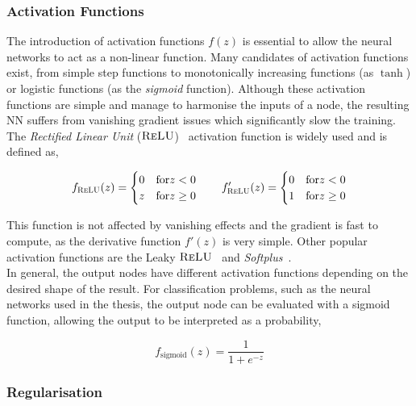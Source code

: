\subsubsection{Activation Functions}

The introduction of activation functions $f(z)$ is essential to allow the neural networks to act as a non-linear function. Many candidates of activation functions exist, from simple step functions to monotonically increasing functions (as $\tanh$) or logistic functions (as the \textit{sigmoid} function). Although these activation functions are simple and manage to harmonise the inputs of a node, the resulting NN suffers from vanishing gradient issues which significantly slow the training. The \textit{Rectified Linear Unit} ($\textsc{ReLU}$)~\cite{relu} activation function is widely used and is defined as,

\begin{align}
    f_\textsc{ReLU}(z)= \begin{cases}
            0& \text{for}  z<0 \\
            z& \text{for}  z\geq0\\
            \end{cases}\qquad f'_\textsc{ReLU}(z)= \begin{cases}
                0& \text{for}  z<0 \\
                1& \text{for}  z\geq0\\
                \end{cases}
\end{align}

This function is not affected by vanishing effects and the gradient is fast to compute, as the derivative function $f'(z)$ is very simple. Other popular activation functions are the Leaky $\textsc{ReLU}$~\cite{lrelu} and \textit{Softplus}~\cite{Maas2013RectifierNI}.\\

In general, the output nodes have different activation functions depending on the desired shape of the result. For classification problems, such as the neural networks used in the thesis, the output node can be evaluated with a sigmoid function, allowing the output to be interpreted as a probability,

\begin{equation}
    f_\text{sigmoid}(z)=\frac{1}{1+e^{-z}}
\end{equation}

\subsubsection{Regularisation}

